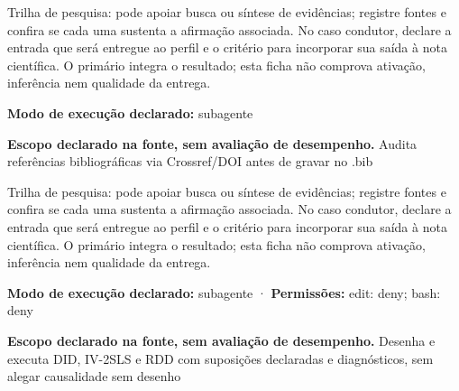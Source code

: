 \begin{funcao}
Trilha de pesquisa: pode apoiar busca ou síntese de evidências; registre fontes e confira se cada uma sustenta a afirmação associada. No caso condutor, declare a entrada que será entregue ao perfil e o critério para incorporar sua saída à nota científica. O primário integra o resultado; esta ficha não comprova ativação, inferência nem qualidade da entrega.
\end{funcao}

\begin{arquitetura}
\textbf{Modo de execução declarado:} subagente
\end{arquitetura}


\begin{descricao}
\textbf{Escopo declarado na fonte, sem avaliação de desempenho.}
Audita referências bibliográficas via Crossref/DOI antes de gravar no .bib
\end{descricao}

\begin{funcao}
Trilha de pesquisa: pode apoiar busca ou síntese de evidências; registre fontes e confira se cada uma sustenta a afirmação associada. No caso condutor, declare a entrada que será entregue ao perfil e o critério para incorporar sua saída à nota científica. O primário integra o resultado; esta ficha não comprova ativação, inferência nem qualidade da entrega.
\end{funcao}

\begin{arquitetura}
\textbf{Modo de execução declarado:} subagente · \textbf{Permissões:} edit: deny; bash: deny
\end{arquitetura}


\begin{descricao}
\textbf{Escopo declarado na fonte, sem avaliação de desempenho.}
Desenha e executa DID, IV-2SLS e RDD com suposições declaradas e diagnósticos, sem alegar causalidade sem desenho
\end{descricao}

